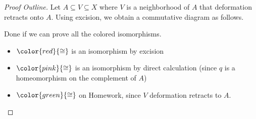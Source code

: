 \begin{proof}[Proof Outline]
	Let $A \subseteq V \subseteq X$ where $V$ is a neighborhood of $A$ that deformation retracts onto $A$. Using excision, we obtain a commutative diagram as follows.
	\par

	\par Done if we can prove all the colored isomorphisms.
	\begin{itemize}
		\item $\color{red}{\cong}$ is an isomorphism by excision
		\item $\color{pink}{\cong}$ is an isomorphism by direct calculation (since $q$ is a homeomorphism on the complement of $A$)
		\item $\color{green}{\cong}$ on Homework, since $V$ deformation retracts to $A$.
	\end{itemize}
\end{proof}